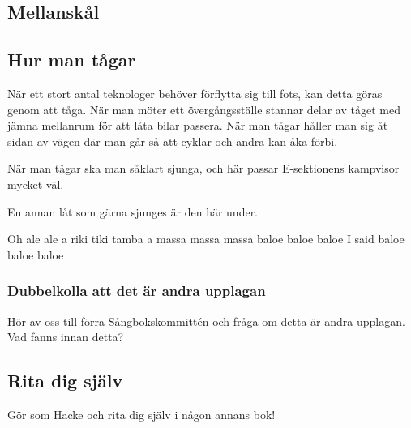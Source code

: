 \subsection*{Mellanskål} 



\subsection*{Hur man tågar}

När ett stort antal teknologer behöver förflytta sig till fots, kan detta göras genom att tåga. 
När man möter ett övergångsställe stannar delar av tåget med jämna mellanrum för att låta bilar passera.
När man tågar håller man sig åt sidan av vägen där man går så att cyklar och andra kan åka förbi.

När man tågar ska man såklart sjunga, och här passar E-sektionens kampvisor mycket väl.

En annan låt som gärna sjunges är den här under. 

Oh ale ale
a riki tiki tamba
a massa massa massa
baloe baloe baloe
I said baloe baloe baloe


\subsubsection*{Dubbelkolla att det är andra upplagan}
Hör av oss till förra Sångbokskommittén och fråga om detta är andra upplagan. Vad fanns innan detta?


\newpage
\subsection*{Rita dig själv}


Gör som Hacke och rita dig själv i någon annans bok!

